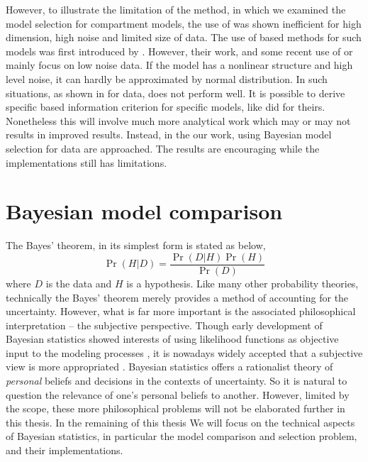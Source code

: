 \documentclass[11pt, hyper, bib, fontset=Minion]{marticle}
\begin{document}
However, to illustrate the limitation of the \aicc method, in
\textcite{Zhou:2011uo} which we examined the model selection for compartment
models, the use of \aicc was shown inefficient for high dimension, high noise
and limited size of data. The use of \aic based methods for such models was
first introduced by \textcite{Hawkins:1986ha}. However, their work, and some
recent use of \aic or \aicc mainly focus on low noise data. If the model has a
nonlinear structure and high level noise, it can hardly be approximated by
normal distribution. In such situations, as shown in \textcite{Zhou:2011uo}
for \pet data, \aicc does not perform well. It is possible to derive specific
\aic based information criterion for specific models, like
\textcite{Hurvich:1989ev} did for theirs. Nonetheless this will involve much
more analytical work which may or may not results in improved results.
Instead, in the our work, using Bayesian model selection for \pet data are
approached. The results are encouraging while the implementations still has
limitations.

\section{Bayesian model comparison}
\label{sec:Bayesian model comparison}

The Bayes' theorem, in its simplest form is stated as below,
\begin{equation}
  \Pr(H|D) = \frac{\Pr(D|H)\Pr(H)}{\Pr(D)} \label{eq:bayes}
\end{equation}
where $D$ is the data and $H$ is a hypothesis. Like many other probability
theories, technically the Bayes' theorem merely provides a method of
accounting for the uncertainty. However, what is far more important is the
associated philosophical interpretation -- the subjective perspective. Though
early development of Bayesian statistics showed interests of using likelihood
functions as objective input to the modeling processes
\parencite{Jeffreys:1961ua, Jeffreys:1946jf}, it is nowadays widely accepted
that a subjective view is more appropriated
\parencite[see][chap.~1]{Bernardo:1994vd}. Bayesian statistics offers a
rationalist theory of \emph{personal} beliefs and decisions in the contexts of
uncertainty. So it is natural to question the relevance of one's personal
beliefs to another. However, limited by the scope, these more philosophical
problems will not be elaborated further in this thesis. In the remaining of
this thesis We will focus on the technical aspects of Bayesian statistics, in
particular the model comparison and selection problem, and their
implementations.
\end{document}
